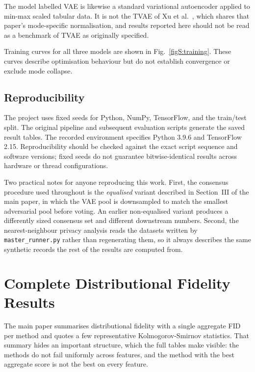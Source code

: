 \documentclass[journal,onecolumn]{IEEEtran}
\begin{document}
The model labelled VAE is likewise a standard variational autoencoder applied to min-max scaled tabular data. It is not the TVAE of Xu et al.\ \cite{xu2019}, which shares that paper's mode-specific normalisation, and results reported here should not be read as a benchmark of TVAE as originally specified.

Training curves for all three models are shown in Fig.~\ref{figS:training}. These curves describe optimisation behaviour but do not establish convergence or exclude mode collapse.



\subsection{Reproducibility}

The project uses fixed seeds for Python, NumPy, TensorFlow, and the train/test split. The original pipeline and subsequent evaluation scripts generate the saved result tables. The recorded environment specifies Python 3.9.6 and TensorFlow 2.15. Reproducibility should be checked against the exact script sequence and software versions; fixed seeds do not guarantee bitwise-identical results across hardware or thread configurations.

Two practical notes for anyone reproducing this work. First, the consensus procedure used throughout is the \emph{equalised} variant described in Section~III of the main paper, in which the VAE pool is downsampled to match the smallest adversarial pool before voting. An earlier non-equalised variant produces a differently sized consensus set and different downstream numbers. Second, the nearest-neighbour privacy analysis reads the datasets written by \texttt{master\_runner.py} rather than regenerating them, so it always describes the same synthetic records the rest of the results are computed from.

\section{Complete Distributional Fidelity Results}

The main paper summarises distributional fidelity with a single aggregate FID per method and quotes a few representative Kolmogorov-Smirnov statistics. That summary hides an important structure, which the full tables make visible: the methods do not fail uniformly across features, and the method with the best aggregate score is not the best on every feature.
\end{document}
